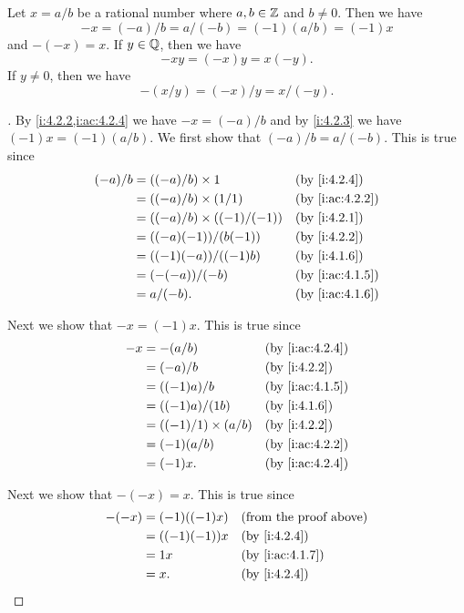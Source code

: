 \begin{ac}\label{i:ac:4.2.5}
  Let \(x = a / b\) be a rational number where \(a, b \in \mathbb{Z}\) and \(b \neq 0\).
  Then we have
  \[
    -x = (-a) / b = a / (-b) = (-1) (a / b) = (-1) x
  \]
  and \(-(-x) = x\).
  If \(y \in \mathbb{Q}\), then we have
  \[
    -xy = (-x) y = x (-y).
  \]
  If \(y \neq 0\), then we have
  \[
    -(x / y) = (-x) / y = x / (-y).
  \]
\end{ac}

\begin{proof}[]
  By \cref{i:4.2.2,i:ac:4.2.4} we have \(-x = (-a) / b\) and by \cref{i:4.2.3} we have \((-1) x = (-1) (a / b)\).
  We first show that \((-a) / b = a / (-b)\).
  This is true since
  \begin{align*}
    (-a) / b & = ((-a) / b) \times 1             &  & \by{i:4.2.4}    \\
             & = ((-a) / b) \times (1 / 1)       &  & \by{i:ac:4.2.2} \\
             & = ((-a) / b) \times ((-1) / (-1)) &  & \by{i:4.2.1}    \\
             & = ((-a) (-1)) / (b (-1))          &  & \by{i:4.2.2}    \\
             & = ((-1) (-a)) / ((-1) b)          &  & \by{i:4.1.6}    \\
             & = (-(-a)) / (-b)                  &  & \by{i:ac:4.1.5} \\
             & = a / (-b).                       &  & \by{i:ac:4.1.6}
  \end{align*}

  Next we show that \(-x = (-1) x\).
  This is true since
  \begin{align*}
    -x & = -(a / b)                  &  & \by{i:ac:4.2.4} \\
       & = (-a) / b                  &  & \by{i:4.2.2}    \\
       & = ((-1) a) / b              &  & \by{i:ac:4.1.5} \\
       & = ((-1) a) / (1b)           &  & \by{i:4.1.6}    \\
       & = ((-1) / 1) \times (a / b) &  & \by{i:4.2.2}    \\
       & = (-1) (a / b)              &  & \by{i:ac:4.2.2} \\
       & = (-1) x.                   &  & \by{i:ac:4.2.4}
  \end{align*}

  Next we show that \(-(-x) = x\).
  This is true since
  \begin{align*}
    -(-x) & = (-1) ((-1) x) &  & \text{(from the proof above)} \\
          & = ((-1) (-1)) x &  & \by{i:4.2.4}                  \\
          & = 1 x           &  & \by{i:ac:4.1.7}               \\
          & = x.            &  & \by{i:4.2.4}
  \end{align*}


\end{proof}
